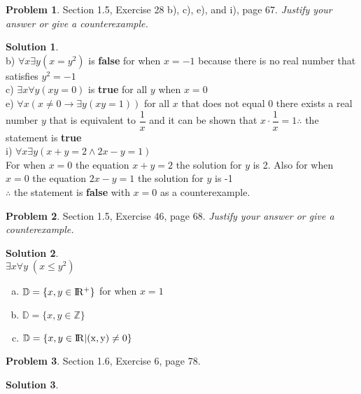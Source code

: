 \documentclass{article}
\theoremstyle{definition}
\newtheorem{problem}{Problem}
\newtheorem*{solution}{Solution}
\begin{document}
\begin{problem} Section 1.5, Exercise 28 b), c), e), and i), page 67. 
\textsl{Justify your answer or give a counterexample.}
\end{problem}
\begin{solution} \ \\
b) $\forall x \exists y (x = y^2) $ is \textbf{false} for when $x = -1$ because there is no real number that satisfies $y^2 = -1$ \vspace{8pt} \\
c) $\exists x \forall y(xy = 0)$ is \textbf{true} for all $y$ when $ x=0$ \vspace{8pt}\\
e) $\forall x (x \neq 0 \rightarrow \exists y (xy = 1))$ for all $x$ that does not equal 0 there exists a real number $y$ that is equivalent to $\dfrac{1}{x}$ and it can be shown that $x \cdot \dfrac{1}{x} = 1 \therefore$ the statement is \textbf{true} \vspace{8pt}\\
i) $\forall x \exists y (x + y = 2 \land 2x - y = 1)$ \\
For when $x = 0$ the equation $x+y=2$ the solution for $y$ is 2. Also for when $x = 0$ the equation $2x-y=1$ the solution for $y$ is -1 \\
$\therefore$ the statement is \textbf{false} with $x=0$ as a counterexample.
\end{solution}

\begin{problem} Section 1.5, Exercise 46, page 68.
\textsl{Justify your answer or give a counterexample.}
\end{problem}
\begin{solution}\ \\ $\exists x \forall y \; (x \leq y^2)$
\begin{enumerate}[a)]
  \item $\mathbb{D} = \{x,y \in \rm I\!R^+ \}$ for when $x=1$
  \item $\mathbb{D} = \{x,y \in \mathbb{Z} \} $
  \item $\mathbb{D} = \{x,y \in \rm{ I\!R} |(x,y) \neq 0 \}$
\end{enumerate}
\end{solution}

\begin{problem} Section 1.6, Exercise 6, page 78. 
\end{problem}
\begin{solution}
\end{solution}
\end{document}
